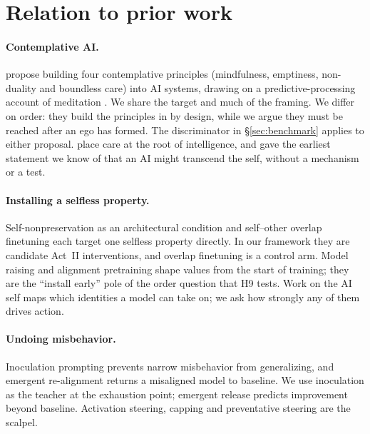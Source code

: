 \documentclass[11pt]{article}
\begin{document}
\section{Relation to prior work}\label{sec:related}

\paragraph{Contemplative AI.} \citet{laukkonen2025contemplative} propose building four contemplative principles
(mindfulness, emptiness, non-duality and boundless care) into AI systems, drawing on a predictive-processing account of
meditation \citep{laukkonen2021many}. We share the target and much of the framing. We differ on order: they build the
principles in by design, while we argue they must be reached after an ego has formed. The discriminator in
\S\ref{sec:benchmark} applies to either proposal. \citet{doctor2022care} place care at the root of intelligence, and
\citet{shanahan2012satori} gave the earliest statement we know of that an AI might transcend the self, without a
mechanism or a test.

\paragraph{Installing a selfless property.} Self-nonpreservation as an architectural condition
\citep{mao2026existential} and self--other overlap finetuning \citep{carauleanu2024soo} each target one selfless
property directly. In our framework they are candidate Act~II interventions, and overlap finetuning is a control arm.
Model raising \citep{aydin2025raising} and alignment pretraining \citep{tice2026pretraining} shape values from the start
of training; they are the ``install early'' pole of the order question that H9 tests. Work on the AI self
\citep{douglas2026artificial} maps which identities a model can take on; we ask how strongly any of them drives action.

\paragraph{Undoing misbehavior.} Inoculation prompting
\citep{wichers2025inoculation,tan2025inoculation,macdiarmid2025natural} prevents narrow misbehavior from generalizing,
and emergent re-alignment \citep{wang2025personafeatures} returns a misaligned model to baseline. We use inoculation as
the teacher at the exhaustion point; emergent release predicts improvement beyond baseline. Activation steering, capping
and preventative steering \citep{turner2023actadd,panickssery2024caa,lu2026assistant,chen2025persona} are the scalpel.
\end{document}
